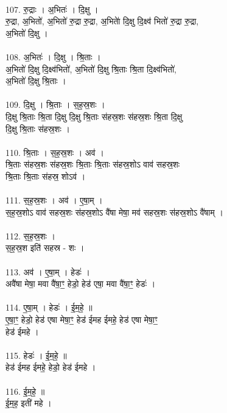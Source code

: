 \\
107. रु॒द्राः । अ॒भितः॑ । दि॒क्षु ।\\
रु॒द्रा, अ॒भितो॑, अ॒भितो॑ रु॒द्रा रु॒द्रा, अ॒भिताे॑ दि॒क्षु दि॒क्ष्व॑ भितो॑ रु॒द्रा रु॒द्रा,\\
अ॒भितो॑ दि॒क्षु ।\\
\\
108. अ॒भितः॑ । दि॒क्षु । श्रि॒ताः ।\\
अ॒भितो॑ दि॒क्षु दि॒क्ष्व॑भितो॑, अ॒भितो॑ दि॒क्षु श्रि॒ताः श्रि॒ता दि॒क्ष्व॑भितो॑,\\
अ॒भितो॑ दि॒क्षु श्रि॒ताः ।\\
\\
109. दि॒क्षु । श्रि॒ताः । स॒ह॒स्र॒शः ।\\
दि॒क्षु श्रि॒ताः श्रि॒ता दि॒क्षु दि॒क्षु श्रि॒ताः स॑हस्र॒शः स॑हस्र॒शः श्रि॒ता दि॒क्षु\\
दि॒क्षु श्रि॒ताः स॑हस्र॒शः ।\\
\\
110. श्रि॒ताः । स॒ह॒स्र॒शः । अव॑ ।\\
श्रि॒ताः स॑हस्र॒शः स॑हस्र॒शः श्रि॒ताः श्रि॒ताः स॑हस्र॒शोऽ वाव॑ सहस्र॒शः\\
श्रि॒ताः श्रि॒ताः स॑हस्र॒ शोऽव॑ ।\\
\\
111. स॒ह॒स्र॒शः । अव॑ । ए॒षा॒म् ।\\
स॒ह॒स्र॒शोऽ वाव॑ सहस्र॒शः स॑हस्र॒शोऽ वै॑षा मेषा॒ मव॑ सहस्र॒शः स॑हस्र॒शोऽ वै॑षाम् ।\\
\\
112. स॒ह॒स्र॒शः ।\\
स॒ह॒स्र॒श इति॑ सहस्र - शः ।\\
\\
113. अव॑ । ए॒षा॒म् । हेडः॑ ।\\
अवै॑षा मेषा॒ मवा वै॑षा॒ꣳ॒ हेडो॒ हेड॑ एषा॒ मवा वै॑षा॒ꣳ॒ हेडः॑ ।\\
\\
114. ए॒षा॒म् । हेडः॑ । ई॒म॒हे॒ ॥\\
ए॒षा॒ꣳ॒ हेडो॒ हेड॑ एषा मेषा॒ꣳ॒ हेड॑ ईमह ईमहे॒ हेड॑ एषा मेषा॒ꣳ॒\\
हेड॑ ईमहे ।\\
\\
115. हेडः॑ । ई॒म॒हे॒ ॥\\
हेड॑ ईमह ईमहे॒ हेडो॒ हेड॑ ईमहे ।\\
\\
116. ई॒म॒हे॒ ॥\\
ई॒म॒ह॒ इती॑ महे ।\\
\\
